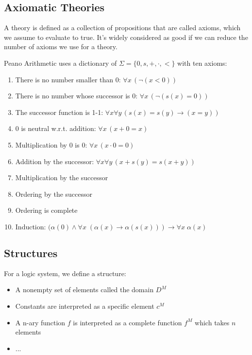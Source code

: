 \documentclass{idc_msc}
\begin{document}
\subsection{Axiomatic Theories}

A theory is defined as a collection of propositions that are called axioms, which we assume to evaluate to true.
It's widely considered as good if we can reduce the number of axioms we use for a theory.

Peano Arithmetic uses a dictionary of \(\Sigma=\{0, s, + , \cdot, <\}\) with ten axioms:

\begin{enumerate}
  \item There is no number smaller than 0: \(\forall x\, (\lnot (x < 0))\)
  \item There is no number whose successor is 0: \(\forall x\, (\lnot(s(x) = 0))\)
  \item The successor function is 1-1: \(\forall x \forall y\, \left(s(x)=s(y) \to (x=y)\right)\)
  \item 0 is neutral w.r.t. addition: \(\forall x \, (x + 0 = x)\)
  \item Multiplication by 0 is 0: \(\forall x \, (x \cdot 0 = 0)\)
  \item Addition by the successor: \(\forall x\forall y\, (x + s(y) = s(x + y))\)
  \item Multiplication by the successor
  \item Ordering by the successor
  \item Ordering is complete
  \item Induction: \((\alpha(0) \land \forall x\; (\alpha(x) \to \alpha\left(s(x)\right)) \to \forall x\; \alpha(x)\)
\end{enumerate}


\subsection{Structures}

For a logic system, we define a structure:

\begin{itemize}
  \item A nonempty set of elements called the domain \(D^M\)
  \item Constants are interpreted as a specific element \(c^M\)
  \item A n-ary function \(f\) is interpreted as a complete function \(f^M\) which takes \(n\) elements
  \item ...
\end{itemize}
\end{document}
